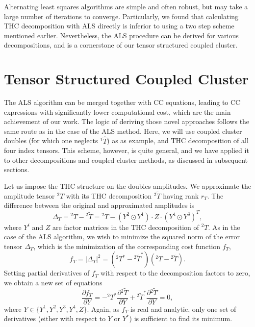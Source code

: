 Alternating least squares algorithms are simple and 
often robust,\cite{uschmajew2012local} but may take a large number of
iterations to converge.\cite{comon2009tensor} Particularly, we found that 
calculating THC decomposition with ALS directly is inferior to using a two 
step scheme mentioned earlier.\cite{schutski2017tensor} Nevertheless, the ALS 
procedure can be derived for various decompositions, and is a cornerstone of 
our tensor structured coupled cluster.

\section{Tensor Structured Coupled Cluster
\label{sec:tcc_derivation}}
The ALS algorithm can be merged together with CC equations, leading to
CC expressions with significantly lower computational cost, which are the main 
achievement of our work.\cite{schutski2017tensor} The logic of deriving those 
novel approaches follows the same route as in the case of the ALS method. Here, 
we will use coupled cluster doubles (for which one neglects ${}^1\hat{T}$) as as 
example, and THC decomposition of all four index tensors. This scheme, 
however, is quite general, and we have applied it to other decompositions and 
coupled cluster methods, as discussed in subsequent sections. 

Let us impose the THC structure on the doubles amplitudes. We
approximate the amplitude tensor ${}^{2}T$ with its THC decomposition
${}^{2}\tilde{T}$ having rank $r_{T}$.  The difference between the original and 
approximated amplitudes is
%
\begin{equation} 
\Delta_{T} = {}^{2}T - {}^{2}\tilde{T} = {}^{2}T -
(Y^{2} \odot Y^{1}) \cdot Z \cdot (Y^{4} \odot Y^{3})^{T},
\end{equation}
%
where $Y^{i}$ and $Z$ are factor matrices in the THC
decomposition of ${}^{2}T$. As in the case of the ALS algorithm, we wish to 
minimize the squared norm of the error tensor $\Delta_{T}$, which is the 
minimization of 
the corresponding cost function $f_{T}$,
%
\begin{equation}
f_{T} = |\Delta_{T}|^2 = ({}^{2}T^{\ast} -
{}^{2}\tilde{T}^{\ast})({}^{2}T - {}^{2}\tilde{T}).
\end{equation}
%
Setting partial derivatives of $f_{T}$ with respect to
the decomposition factors to zero, we obtain a new set of equations
%
\begin{equation} 
\frac{\partial f_{T}}{\partial Y} = - {}^{2}T^{\ast}
\frac{\partial {}^{2} \tilde{T}}{\partial Y} + {}^{2}\tilde{T}^{\ast}
\frac{\partial {}^{2} \tilde{T}}{\partial Y} = 0,
\label{eq:cc_cost_function}
\end{equation}
%
where $Y \in \{Y^{1}, Y^{2}, Y^{3}, Y^{4}, Z\}$. Again,
as $f_{T}$ is real and analytic, only one set of derivatives (either
with respect to $Y$ or $Y^{\ast}$) is sufficient to find its minimum.

